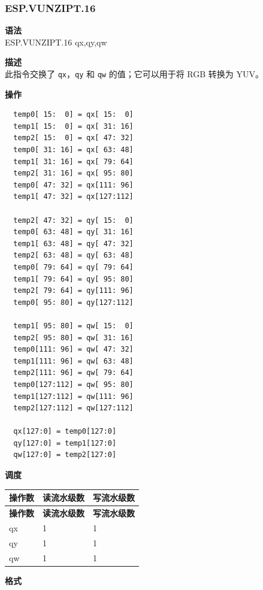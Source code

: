 \newpage
\subsubsection{ESP.VUNZIPT.16}\label{instruction:ESPVUNZIPT16}
\textbf{语法}\\
ESP.VUNZIPT.16 qx,qy,qw

\textbf{描述}\\
此指令交换了 \lstinline{qx}，\lstinline{qy} 和 \lstinline{qw} 的值；它可以用于将 RGB 转换为 YUV。

\textbf{操作}\\
\begin{lstlisting}
  temp0[ 15:  0] = qx[ 15:  0]
  temp1[ 15:  0] = qx[ 31: 16]
  temp2[ 15:  0] = qx[ 47: 32]
  temp0[ 31: 16] = qx[ 63: 48]
  temp1[ 31: 16] = qx[ 79: 64]
  temp2[ 31: 16] = qx[ 95: 80]
  temp0[ 47: 32] = qx[111: 96]
  temp1[ 47: 32] = qx[127:112]

  temp2[ 47: 32] = qy[ 15:  0]
  temp0[ 63: 48] = qy[ 31: 16]
  temp1[ 63: 48] = qy[ 47: 32]
  temp2[ 63: 48] = qy[ 63: 48]
  temp0[ 79: 64] = qy[ 79: 64]
  temp1[ 79: 64] = qy[ 95: 80]
  temp2[ 79: 64] = qy[111: 96]
  temp0[ 95: 80] = qy[127:112]

  temp1[ 95: 80] = qw[ 15:  0]
  temp2[ 95: 80] = qw[ 31: 16]
  temp0[111: 96] = qw[ 47: 32]
  temp1[111: 96] = qw[ 63: 48]
  temp2[111: 96] = qw[ 79: 64]
  temp0[127:112] = qw[ 95: 80]
  temp1[127:112] = qw[111: 96]
  temp2[127:112] = qw[127:112]

  qx[127:0] = temp0[127:0]
  qy[127:0] = temp1[127:0]
  qw[127:0] = temp2[127:0]

\end{lstlisting}

\textbf{调度}\\
\begin{longtable}[c]{|l|l|l|}
    \hline
    \rowcolor{lightgray}
    \textbf{操作数} & \textbf{读流水级数} & \textbf{写流水级数} \\\hline
    \endfirsthead
    \hline
    \rowcolor{lightgray}
     \textbf{操作数} & \textbf{读流水级数} & \textbf{写流水级数} \\\hline
    \endhead
    \hline
    \endfoot

  qx & 1 & 1 \\\hline
  qy & 1 & 1 \\\hline
  qw & 1 & 1

\end{longtable}

\textbf{格式}\\


